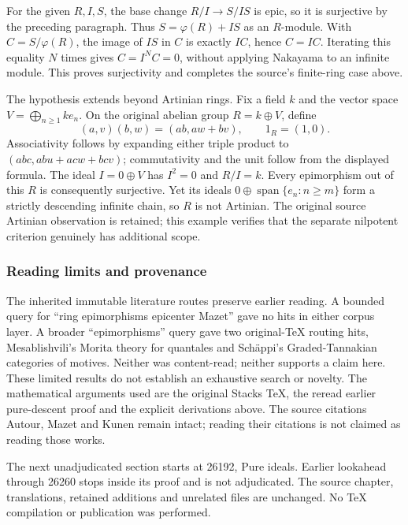 For the given \(R,I,S\), the base change \(R/I\to S/IS\) is epic, so it is surjective by the preceding paragraph. Thus \(S=\varphi(R)+IS\) as an \(R\)-module. With \(C=S/\varphi(R)\), the image of \(IS\) in \(C\) is exactly \(IC\), hence \(C=IC\). Iterating this equality \(N\) times gives \(C=I^NC=0\), without applying Nakayama to an infinite module. This proves surjectivity and completes the source's finite-ring case above.

The hypothesis extends beyond Artinian rings. Fix a field \(k\) and the vector space \(V=\bigoplus_{n\ge1} k e_n\). On the original abelian group \(R=k\oplus V\), define \[
(a,v)(b,w)=(ab,aw+bv),\qquad 1_R=(1,0).
\] Associativity follows by expanding either triple product to \((abc,ab u+ac w+bc v)\); commutativity and the unit follow from the displayed formula. The ideal \(I=0\oplus V\) has \(I^2=0\) and \(R/I=k\). Every epimorphism out of this \(R\) is consequently surjective. Yet its ideals \(0\oplus\operatorname{span}\{e_n:n\ge m\}\) form a strictly descending infinite chain, so \(R\) is not Artinian. The original source Artinian observation is retained; this example verifies that the separate nilpotent criterion genuinely has additional scope.

\subsubsection{Reading limits and provenance}\label{algebra-proof-021-reading-limits-and-provenance}

The inherited immutable literature routes preserve earlier reading. A bounded query for ``ring epimorphisms epicenter Mazet'' gave no hits in either corpus layer. A broader ``epimorphisms'' query gave two original-TeX routing hits, Mesablishvili's Morita theory for quantales and Schäppi's Graded-Tannakian categories of motives. Neither was content-read; neither supports a claim here. These limited results do not establish an exhaustive search or novelty. The mathematical arguments used are the original Stacks TeX, the reread earlier pure-descent proof and the explicit derivations above. The source citations Autour, Mazet and Kunen remain intact; reading their citations is not claimed as reading those works.

The next unadjudicated section starts at 26192, Pure ideals. Earlier lookahead through 26260 stops inside its proof and is not adjudicated. The source chapter, translations, retained additions and unrelated files are unchanged. No TeX compilation or publication was performed.
